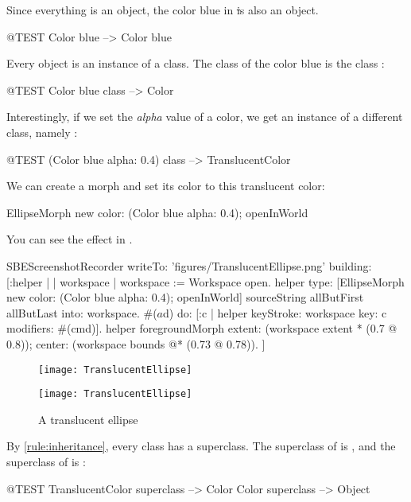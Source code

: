 \documentclass[a4paper,10pt,twoside]{book}
\begin{document}
Since everything is an object, the color blue in \st is also an object.
\begin{code}{@TEST}
Color blue --> Color blue
\end{code}

\noindent
Every object is an instance of a class. The class of the color blue is the class :
\begin{code}{@TEST}
Color blue class --> Color
\end{code}

\noindent
Interestingly, if we set the \emph{alpha} value of a color, we get an instance of a different class, namely :
\begin{code}{@TEST}
(Color blue alpha: 0.4) class --> TranslucentColor
\end{code}

\noindent
We can create a morph and set its color to this translucent color:
\begin{code}{}
EllipseMorph new color: (Color blue alpha: 0.4); openInWorld
\end{code}
\noindent
You can see the effect in .

\begin{ExecuteSmalltalkScript}
SBEScreenshotRecorder writeTo: 'figures/TranslucentEllipse.png' building: [:helper |
	| workspace |
	workspace := Workspace open.
	helper
		type: [EllipseMorph new
			color: (Color blue alpha: 0.4);
			openInWorld]
				sourceString allButFirst allButLast
		into: workspace.
	#($a $d) do: [:c | helper keyStroke: workspace key: c modifiers: #(cmd)].
	helper foregroundMorph
		extent: (workspace extent * (0.7 @ 0.8));
		center: (workspace bounds @* (0.73 @ 0.78)).
]
\end{ExecuteSmalltalkScript}
\begin{center}
\begin{figure}[!ht]
\ifluluelse
	{\centerline {\texttt{[image: TranslucentEllipse]}}}
	{\centerline {\texttt{[image: TranslucentEllipse]}}}
\caption{A translucent ellipse\label{fig:translucentEllipse}}
\end{figure}
\end{center}

By \ref{rule:inheritance}, every class has a superclass.
The superclass of  is , and the superclass of  is :
\begin{code}{@TEST}
TranslucentColor superclass --> Color
Color superclass                   --> Object
\end{code}
\end{document}
